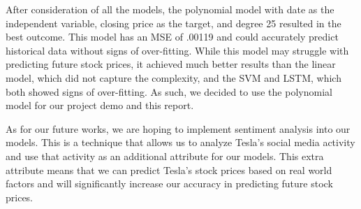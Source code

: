 \documentclass[12pt,a4paper]{article}
\begin{document}
After consideration of all the models, the polynomial model with date as the independent variable, closing price as the target, and degree 25 resulted in the best outcome. This model has an MSE of .00119 and could accurately predict historical data without signs of over-fitting. While this model may struggle with predicting future stock prices, it achieved much better results than the linear model, which did not capture the complexity, and the SVM and LSTM, which both showed signs of over-fitting. As such, we decided to use the polynomial model for our project demo and this report.

As for our future works, we are hoping to implement sentiment analysis into our models. This is a technique that allows us to analyze Tesla’s social media activity and use that activity as an additional attribute for our models. This extra attribute means that we can predict Tesla’s stock prices based on real world factors and will significantly increase our accuracy in predicting future stock prices.
\end{document}
